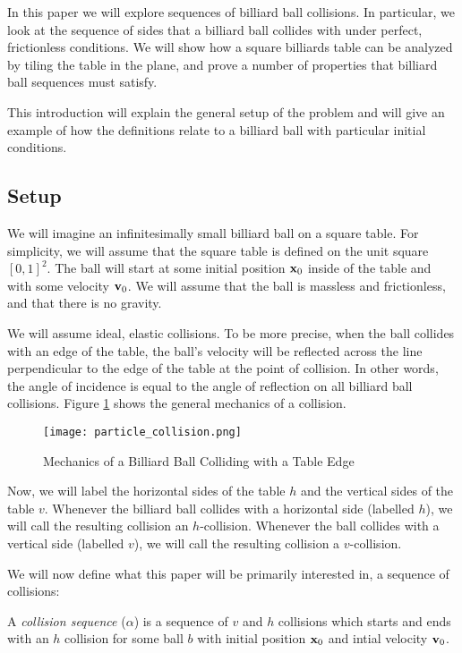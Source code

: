 In this paper we will explore sequences of billiard ball collisions. In particular, we look at the sequence of sides that a billiard ball collides with under perfect, frictionless conditions. We will show how a square billiards table can be analyzed by tiling the table in the plane, and prove a number of properties that billiard ball sequences must satisfy.

This introduction will explain the general setup of the problem and will give an example of how the definitions relate to a billiard ball with particular initial conditions.

\subsection{Setup}

We will imagine an infinitesimally small billiard ball on a square table. For simplicity, we will assume that the square table is defined on the unit square $[0,1]^2$. The ball will start at some initial position $\mathbf{x}_0$ inside of the table and with some velocity $\mathbf{v}_0$. We will assume that the ball is massless and frictionless, and that there is no gravity.

We will assume ideal, elastic collisions. To be more precise, when the ball collides with an edge of the table, the ball's velocity will be reflected across the line perpendicular to the edge of the table at the point of collision. In other words, the angle of incidence is equal to the angle of reflection on all billiard ball collisions. Figure \ref{fig:collision-angle} shows the general mechanics of a collision.

\begin{figure}
  \texttt{[image: particle\_collision.png]}
  \caption{\label{fig:collision-angle}Mechanics of a Billiard Ball Colliding with a Table Edge}
\end{figure}

Now, we will label the horizontal sides of the table $h$ and the vertical sides of the table $v$. Whenever the billiard ball collides with a horizontal side (labelled $h$), we will call the resulting collision an $h$-collision. Whenever the ball collides with a vertical side (labelled $v$), we will call the resulting collision a $v$-collision.

We will now define what this paper will be primarily interested in, a sequence of collisions:

\begin{definition}
  A \emph{collision sequence} ($\alpha$) is a sequence of $v$ and $h$ collisions which starts and ends with an $h$ collision for some ball $b$ with initial position $\mathbf{x}_0$ and intial velocity $\mathbf{v}_0$.
\end{definition}

